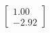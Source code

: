 \documentclass[preview]{standalone}
\begin{document}
\begin{align*}
\begin{bmatrix} 1.00 \\ -2.92 \end{bmatrix}
\end{align*}
\end{document}
